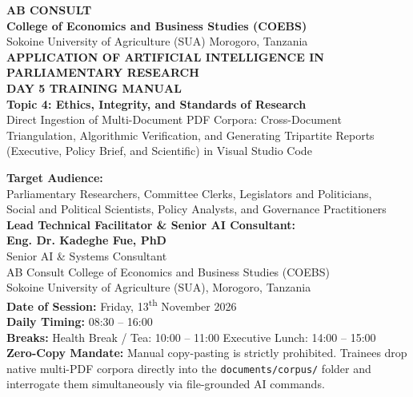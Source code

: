 \documentclass[11pt, a4paper]{report}
\begin{document}
\begin{titlepage}
    \centering
    \vspace*{0.5cm}
    
    {\LARGE \textbf{\textcolor{tanzaniablue}{AB CONSULT}}}\\[0.2cm]
    {\large \textbf{College of Economics and Business Studies (COEBS)}}\\[0.15cm]
    {\normalsize Sokoine University of Agriculture (SUA) \textbullet{} Morogoro, Tanzania}\\[1.2cm]
    
    {\LARGE \textbf{\textcolor{suagreen}{APPLICATION OF ARTIFICIAL INTELLIGENCE IN PARLIAMENTARY RESEARCH}}}\\[0.4cm]
    {\Huge \textbf{DAY 5 TRAINING MANUAL}}\\[0.4cm]
    {\Large \textbf{Topic 4: Ethics, Integrity, and Standards of Research}}\\[0.25cm]
    {\large Direct Ingestion of Multi-Document PDF Corpora: Cross-Document Triangulation, Algorithmic Verification, and Generating Tripartite Reports (Executive, Policy Brief, and Scientific) in Visual Studio Code}\\[1.2cm]
    
    \begin{minipage}{0.92\textwidth}
        \centering
        \textbf{Target Audience:}\\
        Parliamentary Researchers, Committee Clerks, Legislators and Politicians,\\
        Social and Political Scientists, Policy Analysts, and Governance Practitioners\\[0.6cm]
        
        \textbf{Lead Technical Facilitator \& Senior AI Consultant:}\\
        \textbf{\Large Eng. Dr. Kadeghe Fue, PhD}\\
        Senior AI \& Systems Consultant\\
        AB Consult \textbullet{} College of Economics and Business Studies (COEBS)\\
        Sokoine University of Agriculture (SUA), Morogoro, Tanzania\\[0.6cm]
        
        \textbf{Date of Session:} Friday, 13\textsuperscript{th} November 2026\\
        \textbf{Daily Timing:} 08:30 -- 16:00\\
        \textbf{Breaks:} Health Break / Tea: 10:00 -- 11:00 \textbar{} Executive Lunch: 14:00 -- 15:00\\
        \textbf{Zero-Copy Mandate:} Manual copy-pasting is strictly prohibited. Trainees drop native multi-PDF corpora directly into the \texttt{documents/corpus/} folder and interrogate them simultaneously via file-grounded AI commands.
    \end{minipage}
    

\end{titlepage}
\end{document}
